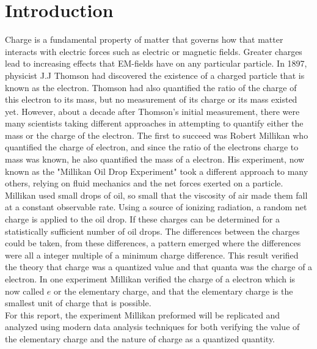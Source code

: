 \documentclass[%
 reprint,
 amsmath,amssymb,
 aps,
]{revtex4-2}
\begin{document}
\section{Introduction}
Charge is a fundamental property of matter that governs how that matter interacts with electric forces such as electric or magnetic fields. Greater charges lead to increasing effects that EM-fields have on any particular particle. In 1897, physicist J.J Thomson had discovered the existence of a charged particle that is known as the electron\cite{thomson}. Thomson had also quantified the ratio of the charge of this electron to its mass, but no measurement of its charge or its mass existed yet. However, about a decade after Thomson's initial measurement, there were many scientists taking different approaches in attempting to quantify either the mass or the charge of the electron. The first to succeed was Robert Millikan who quantified the charge of electron, and since the ratio of the electrons charge to mass was known, he also quantified the mass of a electron. His experiment, now known as the "Millikan Oil Drop Experiment" took a different approach to many others, relying on fluid mechanics and the net forces exerted on a particle. Millikan used small drops of oil, so small that the viscosity of air made them fall at a constant observable rate. Using a source of ionizing radiation, a random net charge is applied to the oil drop. If these charges can be determined for a statistically sufficient number of oil drops. The differences between the charges could be taken, from these differences, a pattern emerged where the differences were all a integer multiple of a minimum charge difference. This result verified the theory that charge was a quantized value and that quanta was the charge of a electron. In one experiment Millikan verified the charge of a electron which is now called $e$ or the elementary charge, and that the elementary charge is the smallest unit of charge that is possible. 
\\
For this report, the experiment Millikan preformed will be replicated and analyzed using modern data analysis techniques for both verifying the value of the elementary charge and the nature of charge as a quantized quantity. 
\end{document}
